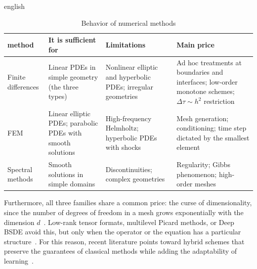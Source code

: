 \documentclass[../0000.tex]{subfiles}
\begin{document}
\begin{hyphenrules}{english}
\begin{table}[ht]
\centering\small
\caption{Behavior of numerical methods}
\label{tab:cruce-clasicos}
\begin{tabularx}{\textwidth}{@{}l >{\raggedright\arraybackslash}X >{\raggedright\arraybackslash}X >{\raggedright\arraybackslash}X@{}}
\toprule
method & It is sufficient for & Limitations & Main price \\
\midrule
Finite differences & Linear PDEs in simple geometry (the three types) & Nonlinear elliptic and hyperbolic PDEs; irregular geometries & Ad hoc treatments at boundaries and interfaces; low-order monotone schemes; $\Delta \tau \sim h^2$ restriction \\
FEM & Linear elliptic PDEs; parabolic PDEs with smooth solutions & High-frequency Helmholtz; hyperbolic PDEs with shocks & Mesh generation; conditioning; time step dictated by the smallest element \\
Spectral methods & Smooth solutions in simple domains & Discontinuities; complex geometries & Regularity; Gibbs phenomenon; high-order meshes \\
\bottomrule
\end{tabularx}
\end{table}

Furthermore, all three families share a common price: the curse of dimensionality, since the number of degrees of freedom in a mesh grows exponentially with the 
dimension $d$~\cite{alkhatib2025numerical,nooraiepour2026partial}. Low-rank tensor formats, multilevel Picard methods, or Deep BSDE avoid this, but only when the 
operator or the equation has a particular structure~\cite{bachmayr2023low,dahmen2016tensor,weinan2021algorithms}. For this reason, recent literature points toward 
hybrid schemes that preserve the guarantees of classical methods while adding the adaptability of learning~\cite{nooraiepour2026partial}.


\end{hyphenrules}
\end{document}
